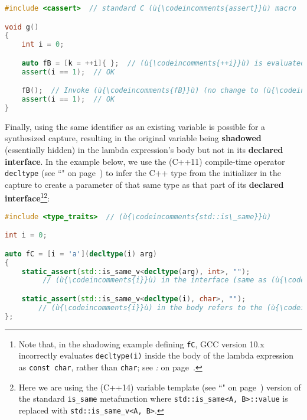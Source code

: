 \begin{lstlisting}[language=C++]
#include <cassert>  // standard C (ù{\codeincomments{assert}}ù) macro

void g()
{
    int i = 0;

    auto fB = [k = ++i]{ };  // (ù{\codeincomments{++i}}ù) is evaluated at creation only.
    assert(i == 1);  // OK

    fB();  // Invoke (ù{\codeincomments{fB}}ù) (no change to (ù{\codeincomments{i}}ù)).
    assert(i == 1);  // OK
}
\end{lstlisting}

\noindent Finally, using the same identifier as an existing
variable is possible for a synthesized capture, resulting in the original variable
being \textbf{shadowed} (essentially hidden) in the lambda expression's
body but not in its \textbf{declared interface}. In the example below,
we use the (C++11) compile-time operator
\texttt{decltype} (see ``" on page~\pageref{decltype}) to infer the C++ type from the
initializer in the capture to create a parameter of that same type as
that part of its \textbf{declared interface}{\cprotect\footnote{Note
that, in the shadowing example defining \texttt{fC}, GCC version 10.x
incorrectly evaluates \texttt{decltype(i)} inside the body of the
lambda expression as \texttt{const}~\texttt{char}, rather than
  \texttt{char}; see \textit{: } on page~\pageref{potential-pitfalls-lambdacapture}.}}{\cprotect\footnote{Here we are using the (C++14) variable
  template (see ``" on page~\pageref{variable-templates}) version of the standard \texttt{is\_same} metafunction where \texttt{std::is\_same<A,}~\texttt{B>::value} is replaced with
  \texttt{std::is\_same\_v<A,}~\texttt{B>}.}}:

\begin{lstlisting}[language=C++]
#include <type_traits>  // (ù{\codeincomments{std::is\_same}}ù)

int i = 0;

auto fC = [i = 'a'](decltype(i) arg)
{
    static_assert(std::is_same_v<decltype(arg), int>, "");
         // (ù{\codeincomments{i}}ù) in the interface (same as (ù{\codeincomments{arg}}ù)) refers to the (ù{\codeincomments{int}}ù) parameter.

    static_assert(std::is_same_v<decltype(i), char>, "");
        // (ù{\codeincomments{i}}ù) in the body refers to the (ù{\codeincomments{char}}ù) data member deduced at capture.
};
\end{lstlisting}

